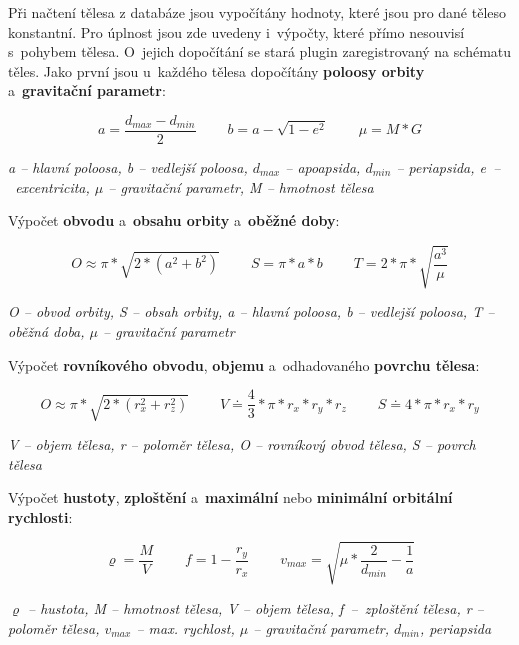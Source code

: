 \documentclass[a4paper,12pt]{article}
\begin{document}
Při načtení tělesa z databáze jsou vypočítány hodnoty, které jsou pro dané těleso konstantní. Pro úplnost jsou zde uvedeny i~výpočty, které přímo nesouvisí s~pohybem tělesa. O~jejich dopočítání se stará plugin zaregistrovaný na schématu těles. Jako první jsou u~každého tělesa dopočítány \textbf{poloosy orbity} a~\textbf{gravitační parametr}:

\vspace*{-0.5cm}
$$a = \frac{d_{max} - d_{min}}{2}~~~~~~~~~~b = a - \sqrt{1 - e^2}~~~~~~~~~~\mu = M * G$$
\begin{center}
\textit{a -- hlavní poloosa, b -- vedlejší poloosa, $d_{max}$ -- apoapsida, $d_{min}$ -- periapsida, e~--~excentricita, $\mu$ -- gravitační parametr, M -- hmotnost tělesa}~\cite{kleczek}
\end{center}

Výpočet \textbf{obvodu} a~\textbf{obsahu orbity} a~\textbf{oběžné doby}:

\vspace*{-0.5cm}
$$O \approx \pi * \sqrt{2 * (a^2 + b^2)}~~~~~~~~~~S = \pi * a * b~~~~~~~~~~T = 2 * \pi * \sqrt{\frac{a^3}{\mu}}$$
\begin{center}
\textit{O -- obvod orbity, S -- obsah orbity, a -- hlavní poloosa, b -- vedlejší poloosa, T -- oběžná doba, $\mu$ -- gravitační parametr}~\cite{kleczek}
\end{center}

Výpočet \textbf{rovníkového obvodu}, \textbf{objemu} a~odhadovaného \textbf{povrchu tělesa}:

\vspace*{-0.5cm}
$$O \approx \pi * \sqrt{2 * (r_{x}^2 + r_{z}^2)}~~~~~~~~~~V \doteq \frac{4}{3} * \pi * r_{x} * r_{y} * r_{z}~~~~~~~~~~S \doteq 4 * \pi * r_{x} * r_{y}$$
\begin{center}
\textit{V -- objem tělesa, r -- poloměr tělesa, O -- rovníkový obvod tělesa, S -- povrch tělesa}~\cite{kleczek}
\end{center}

Výpočet \textbf{hustoty}, \textbf{zploštění} a~\textbf{maximální} nebo \textbf{minimální orbitální rychlosti}:

\vspace*{-0.5cm}
$$\varrho = \frac{M}{V}~~~~~~~~~~f = 1 - \frac{r_{y}}{r_{x}}~~~~~~~~~~v_{max} = \sqrt{\mu * \frac{2}{d_{min}} - \frac{1}{a}}$$
\begin{center}
\textit{$\varrho$ -- hustota, M -- hmotnost tělesa, V -- objem tělesa, f~--~zploštění tělesa, r -- poloměr tělesa, $v_{max}$ -- max. rychlost, $\mu$ -- gravitační parametr, $d_{min}$, periapsida}~\cite{kleczek}
\end{center}
\end{document}
